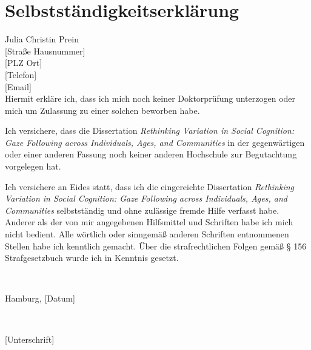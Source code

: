 \documentclass[
]{scrbook}
\begin{document}


\newpage

\chapter*{Selbstständigkeitserklärung}\label{selbststaendigkeit}

Julia Christin Prein\\
{[}Straße Hausnummer{]}\\
{[}PLZ Ort{]}\\
{[}Telefon{]}\\
{[}Email{]}\\

Hiermit erkläre ich, dass ich mich noch keiner Doktorprüfung unterzogen oder mich um Zulassung zu einer solchen beworben habe.

Ich versichere, dass die Dissertation \emph{Rethinking Variation in Social Cognition: Gaze Following across Individuals, Ages, and Communities} in der gegenwärtigen oder einer anderen Fassung noch keiner anderen Hochschule zur Begutachtung vorgelegen hat.

Ich versichere an Eides statt, dass ich die eingereichte Dissertation \emph{Rethinking Variation in Social Cognition: Gaze Following across Individuals, Ages, and Communities} selbstständig und ohne zulässige fremde Hilfe verfasst habe. Anderer als der von mir angegebenen Hilfsmittel und Schriften habe ich mich nicht bedient. Alle wörtlich oder sinngemäß anderen Schriften entnommenen Stellen habe ich kenntlich gemacht. Über die strafrechtlichen Folgen gemäß § 156 Strafgesetzbuch wurde ich in Kenntnis gesetzt.

~

Hamburg, {[}Datum{]}

~

{[}Unterschrift{]}
\end{document}

